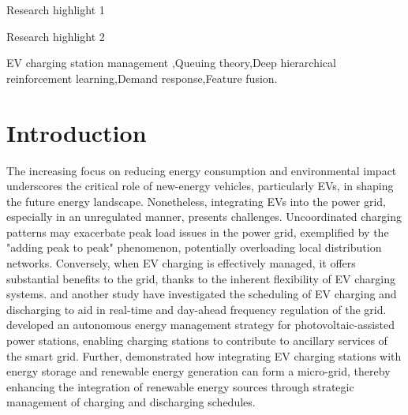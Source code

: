 \documentclass[preprint,12pt]{elsarticle}
\begin{document}
\begin{frontmatter}
\begin{graphicalabstract}
\end{graphicalabstract}

\begin{highlights}
\item Research highlight 1
\item Research highlight 2
\end{highlights}

\begin{keyword}
EV charging station management \sep Queuing theory\sep Deep hierarchical reinforcement learning\sep Demand response\sep  Feature fusion.

\end{keyword}

\end{frontmatter}


\section{Introduction}
\label{}
The increasing focus on reducing energy consumption and environmental impact underscores the critical role of new-energy vehicles, particularly EVs, in shaping the future energy landscape. Nonetheless, integrating EVs into the power grid, especially in an unregulated manner, presents
challenges\citep{wang_coordinated_2023}. Uncoordinated charging patterns
may exacerbate peak load issues in the power grid, exemplified by
the "adding peak to peak" phenomenon, potentially overloading local distribution networks. Conversely, when EV charging is effectively managed, it offers substantial benefits
to the grid, thanks to the inherent flexibility of EV charging systems. \citet{gao_combined_2023} and another study \citet{2020FrequencyReserve} have investigated the scheduling of EV charging and discharging to aid in real-time and day-ahead frequency regulation of the grid. \citet{chen_Ancillary_Service} developed an autonomous energy management strategy for photovoltaic-assisted power stations, enabling charging stations to contribute to ancillary services of the smart grid. Further, \citet{wang_optimal_2020} demonstrated how integrating EV charging stations with energy storage and renewable energy generation can form a micro-grid, thereby enhancing the integration of renewable energy sources through strategic management of charging and discharging schedules.
\end{document}
